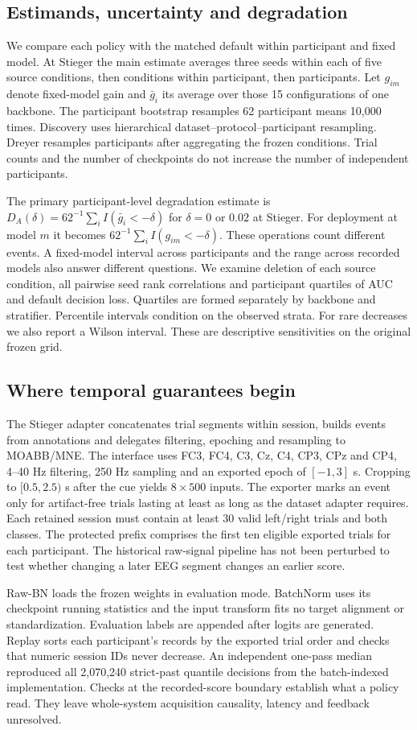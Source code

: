 \subsection{Estimands, uncertainty and degradation}
We compare each policy with the matched default within participant and fixed model. At Stieger the main estimate averages three seeds within each of five source conditions, then conditions within participant, then participants. Let $g_{im}$ denote fixed-model gain and $\bar g_i$ its average over those 15 configurations of one backbone. The participant bootstrap resamples 62 participant means 10,000 times. Discovery uses hierarchical dataset--protocol--participant resampling. Dreyer resamples participants after aggregating the frozen conditions. Trial counts and the number of checkpoints do not increase the number of independent participants.

The primary participant-level degradation estimate is $D_A(\delta)=62^{-1}\sum_i I(\bar g_i<-\delta)$ for $\delta=0$ or $0.02$ at Stieger. For deployment at model $m$ it becomes $62^{-1}\sum_i I(g_{im}<-\delta)$. These operations count different events. A fixed-model interval across participants and the range across recorded models also answer different questions. We examine deletion of each source condition, all pairwise seed rank correlations and participant quartiles of AUC and default decision loss. Quartiles are formed separately by backbone and stratifier. Percentile intervals condition on the observed strata. For rare decreases we also report a Wilson interval. These are descriptive sensitivities on the original frozen grid.

\subsection{Where temporal guarantees begin}
The Stieger adapter concatenates trial segments within session, builds events from annotations and delegates filtering, epoching and resampling to MOABB/MNE. The interface uses FC3, FC4, C3, Cz, C4, CP3, CPz and CP4, 4--40 Hz filtering, 250 Hz sampling and an exported epoch of $[-1,3]$ s. Cropping to $[0.5,2.5)$ s after the cue yields $8\times500$ inputs. The exporter marks an event only for artifact-free trials lasting at least as long as the dataset adapter requires. Each retained session must contain at least 30 valid left/right trials and both classes. The protected prefix comprises the first ten eligible exported trials for each participant. The historical raw-signal pipeline has not been perturbed to test whether changing a later EEG segment changes an earlier score.

Raw-BN loads the frozen weights in evaluation mode. BatchNorm uses its checkpoint running statistics and the input transform fits no target alignment or standardization. Evaluation labels are appended after logits are generated. Replay sorts each participant's records by the exported trial order and checks that numeric session IDs never decrease. An independent one-pass median reproduced all 2,070,240 strict-past quantile decisions from the batch-indexed implementation. Checks at the recorded-score boundary establish what a policy read. They leave whole-system acquisition causality, latency and feedback unresolved.

